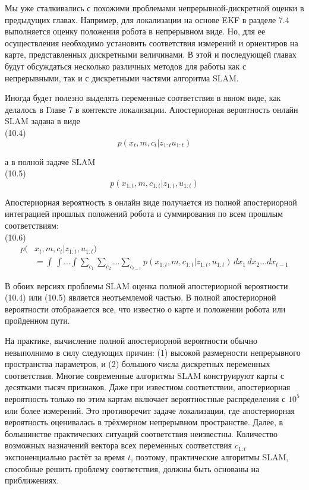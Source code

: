 \documentclass[10pt,a4paper]{article}
\begin{document}
Мы уже сталкивались с похожими проблемами непрерывной-дискретной оценки в предыдущих главах. Например, для локализации на основе EKF в разделе 7.4 выполняется оценку положения робота в непрерывном виде. Но, для ее осуществления необходимо установить соответствия измерений и ориентиров на карте, представленных дискретными величинами. В этой и последующей главах будут обсуждаться несколько различных методов для работы как с непрерывными, так и с дискретными частями алгоритма SLAM.

Иногда будет полезно выделять переменные соответствия в явном виде, как делалось в Главе 7 в контексте локализации. Апостериорная вероятность онлайн SLAM задана в виде\\

(10.4)
$$p(x_t,m,c_t|z_{1:t}u_{1:t})$$

а в полной задаче SLAM \\

(10.5)
$$p(x_{1:t},m,c_{1:t}|z_{1:t},u_{1:t})$$

Апостериорная вероятность в онлайн виде получается из полной апостериорной интеграцией прошлых положений робота и суммирования по всем прошлым соответствиям:\\

(10.6)
\begin{equation*}
\begin{split}
p(&x_t,m,c_t|z_{1:t},u_{1:t}) \\
&=\int\,\int...\int\sum_{c_1}\sum_{c_2}...\sum_{c_{t-1}}p(x_{1:t},m,c_{1:t}|z_{1:t},u_{1:t})\,dx_1\,dx_2...dx_{t-1}
\end{split}
\end{equation*}

В обоих версиях проблемы SLAM оценка полной апостериорной вероятности (10.4) или (10.5) является неотъемлемой частью. В полной апостериорной вероятности отображается все, что известно о карте и положении робота или пройденном пути. 

На практике, вычисление полной апостериорной вероятности обычно невыполнимо в силу следующих причин: (1) высокой размерности непрерывного пространства параметров, и (2) большого числа дискретных переменных соответствия. Многие современные алгоритмы SLAM конструируют карты с десятками тысяч признаков. Даже при известном соответствии, апостериорная вероятность только по этим картам включает вероятностные распределения с $10^5$ или более измерений. Это противоречит задаче локализации, где апостериорная вероятность оценивалась в трёхмерном непрерывном пространстве. Далее, в большинстве практических ситуаций соответствия неизвестны. Количество возможных назначений вектора всех переменных соответствия $c_{1:t}$ экспоненциально растёт за время $t$, поэтому, практические алгоритмы SLAM, способные решить проблему соответствия, должны быть основаны на приближениях.
\end{document}
